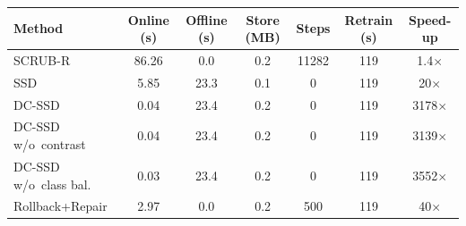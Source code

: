 \begin{tabular}{lcccccc}
\toprule
Method & Online (s) & Offline (s) & Store (MB) & Steps & Retrain (s) & Speed-up \\
\midrule
SCRUB-R & 86.26 & 0.0 & 0.2 & 11282 & 119 & 1.4$\times$ \\
SSD & 5.85 & 23.3 & 0.1 & 0 & 119 & 20$\times$ \\
DC-SSD & 0.04 & 23.4 & 0.2 & 0 & 119 & 3178$\times$ \\
DC-SSD w/o~contrast & 0.04 & 23.4 & 0.2 & 0 & 119 & 3139$\times$ \\
DC-SSD w/o~class bal. & 0.03 & 23.4 & 0.2 & 0 & 119 & 3552$\times$ \\
Rollback+Repair & 2.97 & 0.0 & 0.2 & 500 & 119 & 40$\times$ \\
\bottomrule
\end{tabular}
